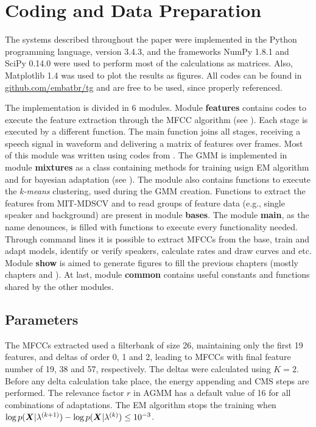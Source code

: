 \section{Coding and Data Preparation}
\label{sec:coding-and-data-preparation}

The systems described throughout the paper were implemented in the Python programming language, version 3.4.3, and the frameworks NumPy 1.8.1 and SciPy 0.14.0 were used to perform most of the calculations as matrices. Also, Matplotlib 1.4 was used to plot the results as figures. All codes can be found in \url{github.com/embatbr/tg} and are free to be used, since properly referenced.

The implementation is divided in 6 modules. Module \textbf{features} contains codes to execute the feature extraction through the MFCC algorithm (see ). Each stage is executed by a different function. The main function joins all stages, receiving a speech signal in waveform and delivering a matrix of features over frames. Most of this module was written using codes from . The GMM is implemented in module \textbf{mixtures} as a class containing methods for training usign EM algorithm and for bayesian adaptation (see ). The module also contains functions to execute the \emph{k-means} clustering, used during the GMM creation. Functions to extract the features from MIT-MDSCV and to read groups of feature data (e.g., single speaker and background) are present in module \textbf{bases}. The module \textbf{main}, as the name denounces, is filled with functions to execute every functionality needed. Through command lines it is possible to extract MFCCs from the base, train and adapt models, identify or verify speakers, calculate rates and draw curves and etc. Module \textbf{show} is aimed to generate figures to fill the previous chapters (mostly chapters  and ). At last, module \textbf{common} contains useful constants and functions shared by the other modules.

\subsection{Parameters}

The MFCCs extracted used a filterbank of size 26, maintaining only the first 19 features, and deltas of order 0, 1 and 2, leading to MFCCs with final feature number of 19, 38 and 57, respectively. The deltas were calculated using $K = 2$. Before any delta calculation take place, the energy appending and CMS steps are performed. The relevance factor $r$ in AGMM has a default value of 16 for all combinations of adaptations. The EM algorithm stops the training when $\log p(\boldsymbol{X}|\lambda^{(k+1)}) - \log p(\boldsymbol{X}|\lambda^{(k)}) \le 10^{-3}$.

